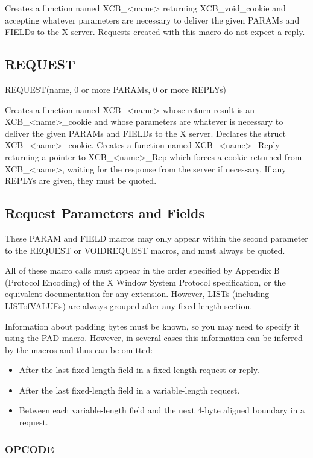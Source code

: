\documentclass[english]{article}
\begin{document}
Creates a function named XCB\_<name> returning XCB\_void\_cookie and
accepting whatever parameters are necessary to deliver the given PARAMs
and FIELDs to the X server. Requests created with this macro do not
expect a reply.


\subsection{REQUEST}

REQUEST(name, 0 or more PARAMs, 0 or more REPLYs)

Creates a function named XCB\_<name> whose return result is
an XCB\_<name>\_cookie and whose parameters are whatever is
necessary to deliver the given PARAMs and FIELDs to the X
server. Declares the struct XCB\_<name>\_cookie.  Creates a
function named XCB\_<name>\_Reply returning a pointer to
XCB\_<name>\_Rep which forces a cookie returned from
XCB\_<name>, waiting for the response from the server if
necessary. If any REPLYs are given, they must be quoted.


\subsection{Request Parameters and Fields}

These PARAM and FIELD macros may only appear within the second
parameter to the REQUEST or VOIDREQUEST macros, and must always
be quoted.

All of these macro calls must appear in the order specified
by Appendix B (Protocol Encoding) of the X Window System Protocol
specification, or the equivalent documentation for any extension.
However, LISTs (including LISTofVALUEs) are always grouped after
any fixed-length section.

Information about padding bytes must be known, so you may need to
specify it using the PAD macro. However, in several cases this
information can be inferred by the macros and thus can be omitted:
  \begin{itemize}
  \item After the last fixed-length field in a fixed-length request or reply.
  \item After the last fixed-length field in a variable-length request.
  \item Between each variable-length field and the next 4-byte aligned boundary in a request.
  \end{itemize}


\subsubsection{OPCODE}
\end{document}
